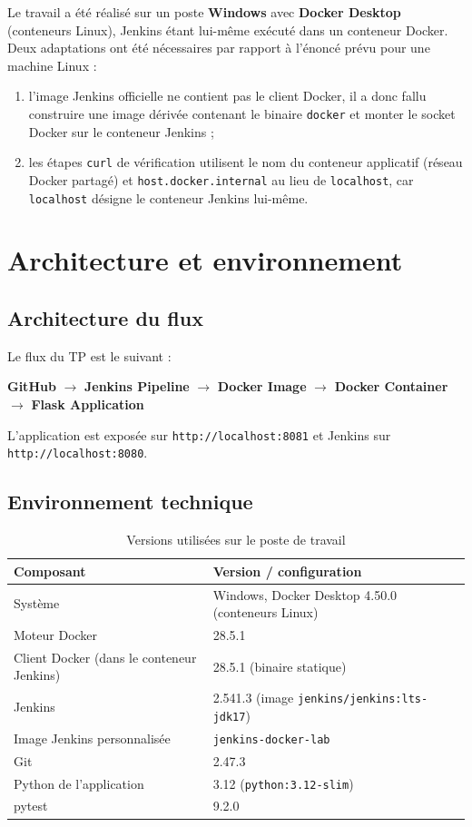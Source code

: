 \documentclass[11pt,a4paper]{article}
\begin{document}
Le travail a été réalisé sur un poste \textbf{Windows} avec \textbf{Docker Desktop}
(conteneurs Linux), Jenkins étant lui-même exécuté dans un conteneur Docker.
Deux adaptations ont été nécessaires par rapport à l'énoncé prévu pour une machine Linux :
\begin{enumerate}[leftmargin=1.2cm]
  \item l'image Jenkins officielle ne contient pas le client Docker, il a donc fallu
        construire une image dérivée contenant le binaire \texttt{docker} et monter le
        socket Docker sur le conteneur Jenkins ;
  \item les étapes \texttt{curl} de vérification utilisent le nom du conteneur
        applicatif (réseau Docker partagé) et \texttt{host.docker.internal} au lieu de
        \texttt{localhost}, car \texttt{localhost} désigne le conteneur Jenkins lui-même.
\end{enumerate}

\section{Architecture et environnement}

\subsection{Architecture du flux}

Le flux du TP est le suivant :
\begin{center}
\textbf{GitHub} $\rightarrow$ \textbf{Jenkins Pipeline} $\rightarrow$
\textbf{Docker Image} $\rightarrow$ \textbf{Docker Container} $\rightarrow$
\textbf{Flask Application}
\end{center}

L'application est exposée sur \texttt{http://localhost:8081} et Jenkins sur
\texttt{http://localhost:8080}.

\subsection{Environnement technique}

\begin{table}[h!]
\centering
\caption{Versions utilisées sur le poste de travail}
\begin{tabular}{@{}ll@{}}
\toprule
Composant & Version / configuration \\
\midrule
Système & Windows, Docker Desktop 4.50.0 (conteneurs Linux) \\
Moteur Docker & 28.5.1 \\
Client Docker (dans le conteneur Jenkins) & 28.5.1 (binaire statique) \\
Jenkins & 2.541.3 (image \texttt{jenkins/jenkins:lts-jdk17}) \\
Image Jenkins personnalisée & \texttt{jenkins-docker-lab} \\
Git & 2.47.3 \\
Python de l'application & 3.12 (\texttt{python:3.12-slim}) \\
pytest & 9.2.0 \\
\bottomrule
\end{tabular}
\end{table}
\end{document}
